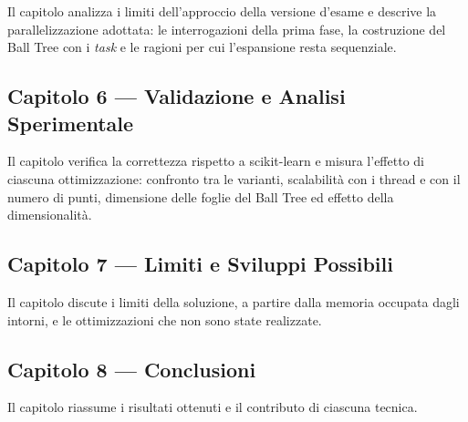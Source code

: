 Il capitolo analizza i limiti dell'approccio della versione d'esame e descrive la parallelizzazione adottata: le interrogazioni della prima fase, la costruzione del Ball Tree con i \emph{task} e le ragioni per cui l'espansione resta sequenziale.

\subsection*{Capitolo 6 --- Validazione e Analisi Sperimentale}

Il capitolo verifica la correttezza rispetto a scikit-learn e misura l'effetto di ciascuna ottimizzazione: confronto tra le varianti, scalabilità con i thread e con il numero di punti, dimensione delle foglie del Ball Tree ed effetto della dimensionalità.

\subsection*{Capitolo 7 --- Limiti e Sviluppi Possibili}

Il capitolo discute i limiti della soluzione, a partire dalla memoria occupata dagli intorni, e le ottimizzazioni che non sono state realizzate.

\subsection*{Capitolo 8 --- Conclusioni}

Il capitolo riassume i risultati ottenuti e il contributo di ciascuna tecnica.
